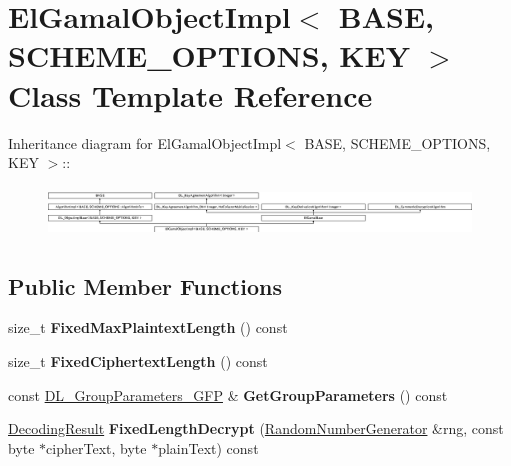 \hypertarget{class_el_gamal_object_impl}{
\section{ElGamalObjectImpl$<$ BASE, SCHEME\_\-OPTIONS, KEY $>$ Class Template Reference}
\label{class_el_gamal_object_impl}
}
Inheritance diagram for ElGamalObjectImpl$<$ BASE, SCHEME\_\-OPTIONS, KEY $>$::\begin{figure}[H]
\begin{center}
\leavevmode
\includegraphics[height=1.3494cm]{class_el_gamal_object_impl}
\end{center}
\end{figure}
\subsection*{Public Member Functions}
\begin{DoxyCompactItemize}
\item 
\hypertarget{class_el_gamal_object_impl_a1121364b14aad73f0e21c98945da987b}{
size\_\-t {\bfseries FixedMaxPlaintextLength} () const }
\label{class_el_gamal_object_impl_a1121364b14aad73f0e21c98945da987b}

\item 
\hypertarget{class_el_gamal_object_impl_a48920f42c4fbd2daa3f1239d2e3d67ef}{
size\_\-t {\bfseries FixedCiphertextLength} () const }
\label{class_el_gamal_object_impl_a48920f42c4fbd2daa3f1239d2e3d67ef}

\item 
\hypertarget{class_el_gamal_object_impl_a2d231f1f248c5101c3db33b1b323dfd9}{
const \hyperlink{class_d_l___group_parameters___g_f_p}{DL\_\-GroupParameters\_\-GFP} \& {\bfseries GetGroupParameters} () const }
\label{class_el_gamal_object_impl_a2d231f1f248c5101c3db33b1b323dfd9}

\item 
\hypertarget{class_el_gamal_object_impl_aaa05597da937255a2685e870eceeeb35}{
\hyperlink{struct_decoding_result}{DecodingResult} {\bfseries FixedLengthDecrypt} (\hyperlink{class_random_number_generator}{RandomNumberGenerator} \&rng, const byte $\ast$cipherText, byte $\ast$plainText) const }
\label{class_el_gamal_object_impl_aaa05597da937255a2685e870eceeeb35}

\end{DoxyCompactItemize}
